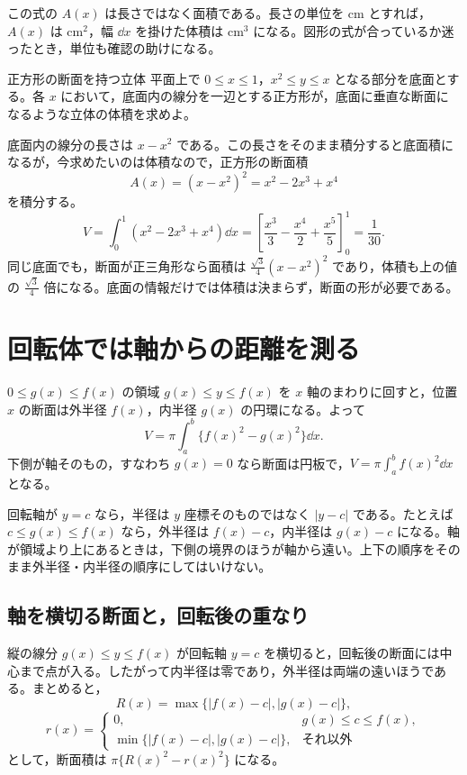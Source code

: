 この式の $A(x)$ は長さではなく面積である。長さの単位を $\mathrm{cm}$ とすれば，$A(x)$ は $\mathrm{cm}^2$，幅 $\dd x$ を掛けた体積は $\mathrm{cm}^3$ になる。図形の式が合っているか迷ったとき，単位も確認の助けになる。

\begin{example}{正方形の断面を持つ立体}
平面上で $0\leq x\leq1$，$x^2\leq y\leq x$ となる部分を底面とする。各 $x$ において，底面内の線分を一辺とする正方形が，底面に垂直な断面になるような立体の体積を求めよ。
\end{example}

底面内の線分の長さは $x-x^2$ である。この長さをそのまま積分すると底面積になるが，今求めたいのは体積なので，正方形の断面積
\[
A(x)=(x-x^2)^2=x^2-2x^3+x^4
\]
を積分する。
\[
V=\int_0^1(x^2-2x^3+x^4)\dd x
 =\left[\frac{x^3}{3}-\frac{x^4}{2}+\frac{x^5}{5}\right]_0^1
 =\frac1{30}.
\]
同じ底面でも，断面が正三角形なら面積は $\frac{\sqrt3}{4}(x-x^2)^2$ であり，体積も上の値の $\frac{\sqrt3}{4}$ 倍になる。底面の情報だけでは体積は決まらず，断面の形が必要である。

\section{回転体では軸からの距離を測る}\label{節:回転体の体積}

$0\leq g(x)\leq f(x)$ の領域 $g(x)\leq y\leq f(x)$ を $x$ 軸のまわりに回すと，位置 $x$ の断面は外半径 $f(x)$，内半径 $g(x)$ の円環になる。よって
\begin{equation}\label{式:円環断面の体積}
V=\pi\int_a^b\{f(x)^2-g(x)^2\}\dd x.
\end{equation}
下側が軸そのもの，すなわち $g(x)=0$ なら断面は円板で，$V=\pi\int_a^b f(x)^2\dd x$ となる。

回転軸が $y=c$ なら，半径は $y$ 座標そのものではなく $|y-c|$ である。たとえば $c\leq g(x)\leq f(x)$ なら，外半径は $f(x)-c$，内半径は $g(x)-c$ になる。軸が領域より上にあるときは，下側の境界のほうが軸から遠い。上下の順序をそのまま外半径・内半径の順序にしてはいけない。

\subsection{軸を横切る断面と，回転後の重なり}

縦の線分 $g(x)\leq y\leq f(x)$ が回転軸 $y=c$ を横切ると，回転後の断面には中心まで点が入る。したがって内半径は零であり，外半径は両端の遠いほうである。まとめると，
\[
R(x)=\max\{|f(x)-c|,|g(x)-c|\},
\]
\[
r(x)=
\begin{cases}
0,&g(x)\leq c\leq f(x),\\
\min\{|f(x)-c|,|g(x)-c|\},&\text{それ以外}
\end{cases}
\]
として，断面積は $\pi\{R(x)^2-r(x)^2\}$ になる。

